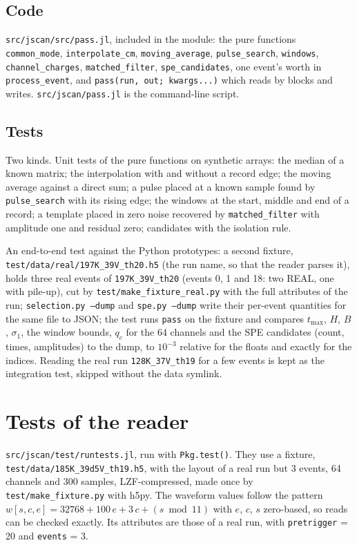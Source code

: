 \documentclass[11pt]{article}
\newcommand{\code}[1]{\texttt{#1}}
\begin{document}
\subsection{Code}

\code{src/jscan/src/pass.jl}, included in the module: the pure functions
\code{common\_mode}, \code{interpolate\_cm}, \code{moving\_average},
\code{pulse\_search}, \code{windows}, \code{channel\_charges},
\code{matched\_filter}, \code{spe\_candidates}, one event's worth in
\code{process\_event}, and \code{pass(run, out; kwargs...)} which reads by
blocks and writes. \code{src/jscan/pass.jl} is the command-line script.

\subsection{Tests}

Two kinds. Unit tests of the pure functions on synthetic arrays: the
median of a known matrix; the interpolation with and without a record
edge; the moving average against a direct sum; a pulse placed at a known
sample found by \code{pulse\_search} with its rising edge; the windows at
the start, middle and end of a record; a template placed in zero noise
recovered by \code{matched\_filter} with amplitude one and residual zero;
candidates with the isolation rule.

An end-to-end test against the Python prototypes: a second fixture,
\code{test/data/real/197K\_39V\_th20.h5} (the run name, so that the reader parses it), holds three real events of
\code{197K\_39V\_th20} (events 0, 1 and 18: two REAL, one with pile-up),
cut by \code{test/make\_fixture\_real.py} with the full attributes of the
run; \code{selection.py --dump} and \code{spe.py --dump} write their
per-event quantities for the same file to JSON; the test runs \code{pass}
on the fixture and compares $t_{\max}$, $H$, $B$, $\sigma_1$, the window
bounds, $q_c$ for the 64 channels and the SPE candidates (count, times,
amplitudes) to the dump, to $10^{-3}$ relative for the floats and exactly
for the indices. Reading the real run \code{128K\_37V\_th19} for a few
events is kept as the integration test, skipped without the data symlink.

\section{Tests of the reader}

\code{src/jscan/test/runtests.jl}, run with \code{Pkg.test()}. They use a
fixture, \code{test/data/185K\_39d5V\_th19.h5}, with the layout of a real run
but 3 events, 64 channels and 300 samples, LZF-compressed, made once by
\code{test/make\_fixture.py} with h5py. The waveform values follow the
pattern $w[s, c, e] = 32768 + 100\,e + 3\,c + (s \bmod 11)$ with $e$, $c$,
$s$ zero-based, so reads can be checked exactly. Its attributes are those of
a real run, with \code{pretrigger} = 20 and \code{events} = 3.
\end{document}
